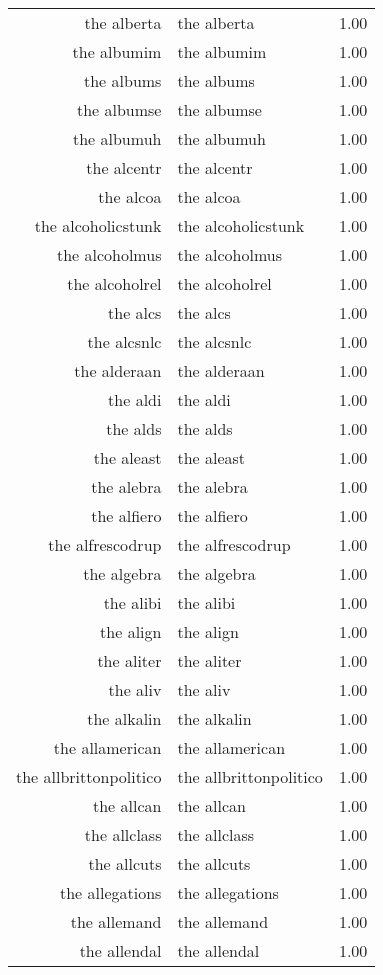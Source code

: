 \begin{table}[ht]
\begin{tabular}{rlr}
  the alberta & the alberta & 1.00 \\ 
  the albumim & the albumim & 1.00 \\ 
  the albums & the albums & 1.00 \\ 
  the albumse & the albumse & 1.00 \\ 
  the albumuh & the albumuh & 1.00 \\ 
  the alcentr & the alcentr & 1.00 \\ 
  the alcoa & the alcoa & 1.00 \\ 
  the alcoholicstunk & the alcoholicstunk & 1.00 \\ 
  the alcoholmus & the alcoholmus & 1.00 \\ 
  the alcoholrel & the alcoholrel & 1.00 \\ 
  the alcs & the alcs & 1.00 \\ 
  the alcsnlc & the alcsnlc & 1.00 \\ 
  the alderaan & the alderaan & 1.00 \\ 
  the aldi & the aldi & 1.00 \\ 
  the alds & the alds & 1.00 \\ 
  the aleast & the aleast & 1.00 \\ 
  the alebra & the alebra & 1.00 \\ 
  the alfiero & the alfiero & 1.00 \\ 
  the alfrescodrup & the alfrescodrup & 1.00 \\ 
  the algebra & the algebra & 1.00 \\ 
  the alibi & the alibi & 1.00 \\ 
  the align & the align & 1.00 \\ 
  the aliter & the aliter & 1.00 \\ 
  the aliv & the aliv & 1.00 \\ 
  the alkalin & the alkalin & 1.00 \\ 
  the allamerican & the allamerican & 1.00 \\ 
  the allbrittonpolitico & the allbrittonpolitico & 1.00 \\ 
  the allcan & the allcan & 1.00 \\ 
  the allclass & the allclass & 1.00 \\ 
  the allcuts & the allcuts & 1.00 \\ 
  the allegations & the allegations & 1.00 \\ 
  the allemand & the allemand & 1.00 \\ 
  the allendal & the allendal & 1.00 \\ 

\end{tabular}
\end{table}
